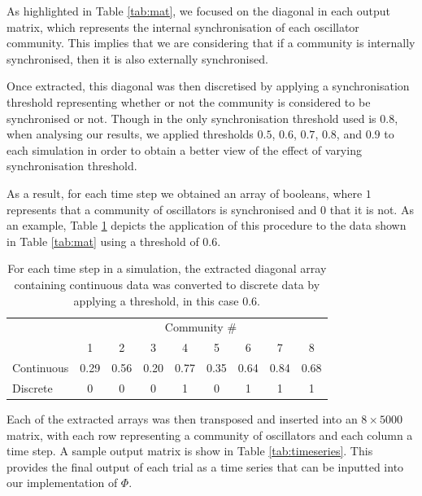 \documentclass[a4paper,11pt]{article}
\begin{document}
As highlighted in Table \ref{tab:mat}, we focused on the diagonal in each output matrix, which represents the internal synchronisation of each oscillator community. This implies that we are considering that if a community is internally synchronised, then it is also externally synchronised.

Once extracted, this diagonal was then discretised by applying a synchronisation threshold representing whether or not the community is considered to be synchronised or not. Though in \cite{Shanahan2010} the only synchronisation threshold used is $0.8$, when analysing our results, we applied thresholds $0.5$, $0.6$, $0.7$, $0.8$, and $0.9$ to each simulation in order to obtain a better view of the effect of varying synchronisation threshold.

As a result, for each time step we obtained an array of booleans, where $1$ represents that a community of oscillators is synchronised and $0$ that it is not. As an example, Table \ref{tab:arr} depicts the application of this procedure to the data shown in Table \ref{tab:mat} using a threshold of $0.6$.

\begin{table}[ht]
\centering
\begin{tabular}{l | c c c c c c c c}
& \multicolumn{8}{c}{Community \#} \\ [2mm]
& 1 & 2 & 3 & 4 & 5 & 6 & 7 & 8 \\
\hline
Continuous & 0.29 & 0.56 & 0.20 & 0.77 & 0.35 & 0.64 & 0.84 & 0.68 \\
Discrete & 0 & 0 & 0 & 1 & 0 & 1 & 1 & 1 \\
\end{tabular}
\caption{For each time step in a simulation, the extracted diagonal array containing continuous data was converted to discrete data by applying a threshold, in this case $0.6$. \label{tab:arr}}
\end{table}
 
Each of the extracted arrays was then transposed and inserted into an $8 \times 5000$ matrix, with each row representing a community of oscillators and each column a time step. A sample output matrix is show in Table \ref{tab:timeseries}. This provides the final output of each trial as a time series that can be inputted into our implementation of $\Phi$.
\end{document}
